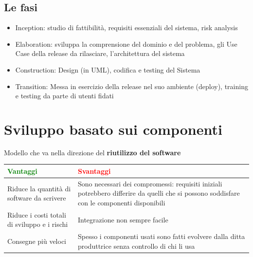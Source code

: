 \documentclass[12pt, a4paper]{report}
\begin{document}
\subsection{Le fasi}
\begin{itemize}
    \item Inception: studio di fattibilità, requisiti essenziali del sistema, risk analysis
    \item Elaboration: sviluppa la comprensione del dominio e del problema, gli Use Case della release da rilasciare, l'architettura del sistema
    \item Construction: Design (in UML), codifica e testing del Sistema
    \item Transition: Messa in esercizio della release nel suo ambiente (deploy), training e testing da parte di utenti fidati
\end{itemize}
\section{Sviluppo basato sui componenti}
Modello che va nella direzione del \textbf{riutilizzo del software}
\begin{center}
    \begin{tabular}{|p{}|p{}|}
        \hline
        \textbf{\textcolor{green}{Vantaggi}} & \textbf{\textcolor{red}{Svantaggi}} \\
        \hline
        Riduce la quantità di software da scrivere & Sono necessari dei compromessi: requisiti iniziali potrebbero differire da quelli che si possono soddisfare con le componenti disponibili \\
        \hline
        Riduce i costi totali di sviluppo e i rischi & Integrazione non sempre facile \\
        \hline
        Consegne più veloci & Spesso i componenti usati sono fatti evolvere dalla ditta produttrice senza controllo di chi li usa \\
        \hline
    \end{tabular}
\end{center}
\end{document}
